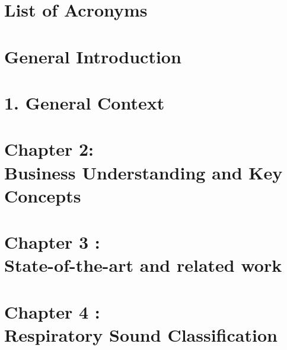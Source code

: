 \documentclass[12pt]{report}
\begin{document}

\newpage

\chapter*{List of Acronyms}


\listoffigures


\newpage


\chapter*{General Introduction}


\chapter{1. General Context}


\newpage

\setcounter{chapter}{2}  %
\setcounter{section}{0}
\chapter*{Chapter 2:\\ Business Understanding and Key Concepts}





\newpage

\setcounter{chapter}{3}
\setcounter{section}{0}
\chapter*{Chapter 3 :\\ State-of-the-art and related work}



\setcounter{chapter}{4}
\chapter*{Chapter 4 :\\ Respiratory Sound Classification}






\end{document}
